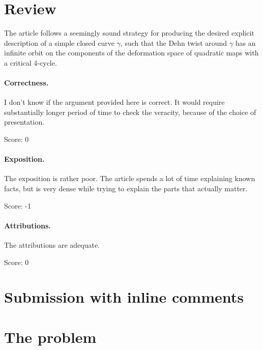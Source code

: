 \documentclass[11pt]{article}
\theoremstyle{definition}
\begin{document}
\maketitle

\section{Review}
The article follows a seemingly sound strategy for producing the desired explicit description of a simple closed curve $\gamma$, such that the Dehn twist around $\gamma$ has an infinite orbit on the components of the deformation space of quadratic maps with a critical 4-cycle. 

\paragraph{Correctness.}

 I don't know if the argument provided here is correct. It would require substantially longer period of time to check the veracity, because of the choice of presentation.

\noindent Score: 0

\paragraph{Exposition.}

The exposition is rather poor. The article spends a lot of time explaining known facts, but is very dense while trying to explain the parts that actually matter. 

\noindent Score: -1

\paragraph{Attributions.}

The attributions are adequate.

\noindent Score: 0


\newpage
\section{Submission with inline comments}


\section{The problem}
\end{document}
